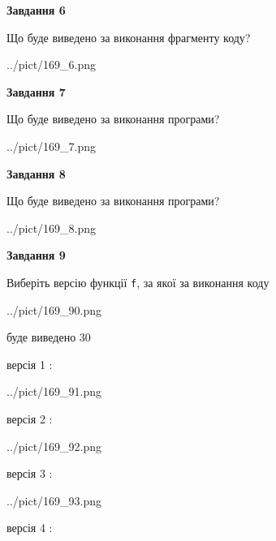\documentclass[12pt, ukrainian]{article}
\def\code#1{\Verb!#1!}
\begin{document}
{\begin {large}
{\begin {center}\textbf{Завдання 6}\end {center}}

Що буде виведено за виконання фрагменту коду?\par
\begin{center}
	{../pict/169_6.png}
\end{center}
\newpage

{\begin {center}\textbf{Завдання 7}\end {center}}

Що буде виведено за виконання програми?\par
\begin{center}
	{../pict/169_7.png}
\end{center}
\newpage

{\begin {center}\textbf{Завдання 8}\end {center}}

Що буде виведено за виконання програми?\par
\begin{center}
	{../pict/169_8.png}
\end{center}
\newpage

{\begin {center}\textbf{Завдання 9}\end {center}}

Виберіть версію функції \code{f}, за якої за виконання коду
\begin{center}
	{../pict/169_90.png}
\end{center}
буде виведено 30

\vspace{5mm}
версія 1 :

\begin{center}
	{../pict/169_91.png}
\end{center}
версія 2 :

\begin{center}
	{../pict/169_92.png}
\end{center}
версія 3 :

\begin{center}
	{../pict/169_93.png}
\end{center}
версія 4 :


\end{large}}
\end{document}

